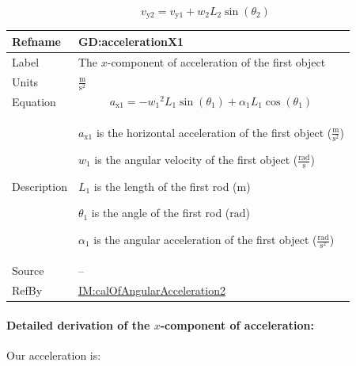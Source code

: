 \documentclass[12pt]{article}
\begin{document}
\begin{displaymath}
{v_{\text{y}2}}={v_{\text{y}1}}+{w_{2}} {L_{2}} \sin\left({θ_{2}}\right)
\end{displaymath}
\vspace{\baselineskip}
\noindent
\begin{minipage}{\textwidth}
\begin{tabular}{>{\raggedright}p{}>{\raggedright\arraybackslash}p{}}
\toprule \textbf{Refname} & \textbf{GD:accelerationX1}
\label{GD:accelerationX1}
\\ \midrule
Label & The $x$-component of acceleration of the first object
        
\\ \midrule
Units & $\frac{\text{m}}{\text{s}^{2}}$
        
\\ \midrule
Equation & \begin{displaymath}
           {a_{\text{x}1}}=-{w_{1}}^{2} {L_{1}} \sin\left({θ_{1}}\right)+{α_{1}} {L_{1}} \cos\left({θ_{1}}\right)
           \end{displaymath}
\\ \midrule
Description & \begin{symbDescription}
              \item{${a_{\text{x}1}}$ is the horizontal acceleration of the first object ($\frac{\text{m}}{\text{s}^{2}}$)}
              \item{${w_{1}}$ is the angular velocity of the first object ($\frac{\text{rad}}{\text{s}}$)}
              \item{${L_{1}}$ is the length of the first rod (${\text{m}}$)}
              \item{${θ_{1}}$ is the angle of the first rod (${\text{rad}}$)}
              \item{${α_{1}}$ is the angular acceleration of the first object ($\frac{\text{rad}}{\text{s}^{2}}$)}
              \end{symbDescription}
\\ \midrule
Source & --
         
\\ \midrule
RefBy & \hyperref[IM:calOfAngularAcceleration2]{IM:calOfAngularAcceleration2}
        
\\ \bottomrule
\end{tabular}
\end{minipage}

\paragraph{Detailed derivation of the $x$-component of acceleration:}
\label{GD:accelerationX1Deriv}
Our acceleration is:
\end{document}
